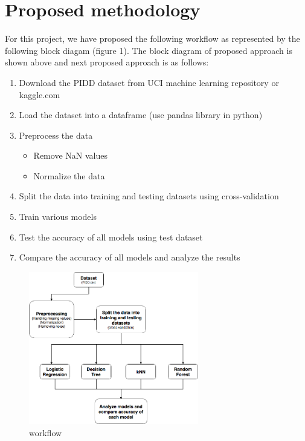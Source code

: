 \documentclass{article}
\begin{document}
\section{Proposed methodology}

For this project, we have proposed the following workflow as represented by the following block diagam (figure 1).
The  block  diagram  of   proposed  approach  is  shown  above  and  next  proposed  approach  is  as  follows:
\begin{enumerate}
	\item Download the PIDD dataset from UCI machine learning repository or kaggle.com
	\item Load the dataset into a dataframe (use pandas library in python)	
	\item Preprocess the data
	\begin{itemize}
		\item Remove NaN values
		\item Normalize the data
	\end{itemize}
	\item Split the data into training and testing datasets using cross-validation
	\item Train various models
	\item Test the accuracy of all models using test dataset
	\item Compare the accuracy of all models and analyze the results
\end{enumerate}
	
\begin{figure}[h]
	\centering
	\includegraphics[width=280px]{workflow.png}
	\caption{workflow}
\end{figure}
\end{document}
